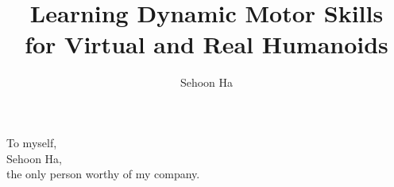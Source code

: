 \documentclass[12pt]{gatech-thesis}
\title{Learning Dynamic Motor Skills \protect\\
  for Virtual and Real Humanoids}
\author{Sehoon Ha}
\begin{document}

\begin{preliminary}
\begin{dedication}
\null\vfil
{\large
\begin{center}
To myself,\\\vspace{12pt}
Sehoon Ha,\\\vspace{12pt}
the only person worthy of my company.
\end{center}}
\vfil\null
\end{dedication}
\begin{acknowledgements}

\end{acknowledgements}
\contents
\begin{summary}

\end{summary}
\end{preliminary}










\end{document}
